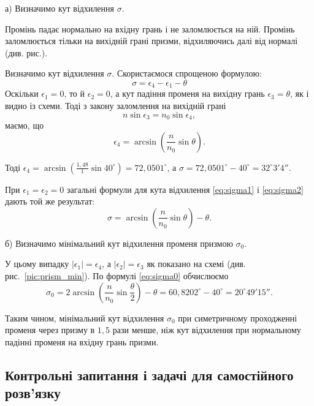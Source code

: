 \begin{solutionexample}

	а) Визначимо кут відхилення $\sigma$.

	\bigskip

	Промінь падає нормально на вхідну грань і не заломлюється на ній.
	Промінь заломлюється тільки на вихідній грані призми, відхиляючись далі
	від нормалі (див. рис.).

	\begin{center}
		
	\end{center}
	Визначимо кут відхилення $\sigma$. Скористаємося спрощеною формулою:
	\[
		\sigma = \epsilon_4 - \epsilon_1 - \theta
	\]
	Оскільки $\epsilon_1 = 0$, то й $\epsilon_2 = 0$, а кут падіння променя на вихідну грань $\epsilon_3 = \theta$,
	як і видно із схеми. Тоді з закону заломлення на вихідній грані
	\[
		n\sin\epsilon_3 = n_0 \sin\epsilon_4,
	\]
	маємо, що
	\[
		\epsilon_4 = \arcsin \left( \frac{n}{n_0}\sin\theta \right).
	\]


	Тоді $\epsilon_4 = \arcsin \left( \frac{1,48}{1} \sin 40^\circ\right) = 72,0501^\circ $, а $\sigma =  72,0501^\circ - 40^\circ = 32^\circ3' 4''$.

	При $\epsilon_1 = \epsilon_2 = 0$ загальні формули для кута відхилення \eqref{eq:sigma1} і \eqref{eq:sigma2}
	дають той же результат:
	\[
		\sigma = \arcsin\left( \frac{n}{n_0} \sin\theta\right) - \theta .
	\]

	б) Визначимо мінімальний кут відхилення променя призмою  $\sigma_0$.

	\bigskip

	У цьому випадку $|\epsilon_1| = \epsilon_4$, а $|\epsilon_2| = \epsilon_3$ як показано на схемі (див. рис.~\ref{pic:prism_min}). По
	формулі \eqref{eq:sigma0} обчислюємо
	\[
		\sigma_0 = 2\arcsin\left( \frac{n}{n_0}\sin\frac{\theta}{2}\right) - \theta = 60,8202^\circ - 40^\circ = 20^\circ49'15''.
	\]

	Таким чином, мінімальний кут відхилення $\sigma_0$ при симетричному
	проходженні променя через призму в $1,5$ рази менше, ніж кут відхилення
	при нормальному падінні променя на вхідну грань призми.
\end{solutionexample}

\subsection{Контрольні запитання і задачі для самостійного розв’язку}



